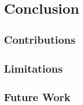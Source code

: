 \chapter{Conclusion}\label{ch:conclusion}

\section{Contributions}

\section{Limitations}

\section{Future Work}